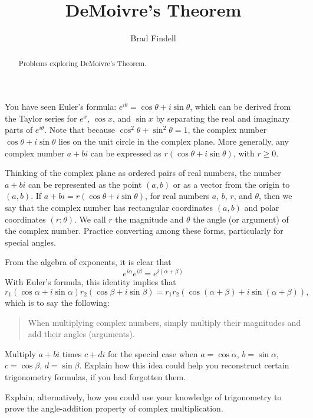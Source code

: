 \documentclass[space,nooutcomes]{ximera}
\title{DeMoivre's Theorem}
\author{Brad Findell}
\begin{document}
\begin{abstract}
Problems exploring DeMoivre's Theorem.   
\end{abstract}
\maketitle




You have seen Euler's formula: $e^{i\theta}=\cos\theta +i\sin\theta$, which can be derived from the Taylor series for $e^{x}$, $\cos x$, and $\sin x$ by separating the real and imaginary parts of $e^{i\theta}$.  Note that because 
$\cos^2\theta+\sin^2\theta=1$, the complex number $\cos\theta +i\sin\theta$ lies on the 
unit circle in the complex plane.  More generally, any complex number $a+bi$ can be expressed as $r(\cos\theta +i\sin\theta)$, with $r\ge 0$.  

Thinking of the complex plane as ordered pairs of real numbers, the number $a+bi$ can be represented as the point $(a,b)$ or as a vector from the origin to
$(a,b)$.  If $a+bi = r(\cos\theta +i\sin\theta)$, for real numbers $a$, $b$, $r$, and $\theta$, then we say that the complex number has rectangular coordinates $(a,b)$ and polar coordinates $(r;\theta)$. We call $r$ the magnitude and $\theta$ the angle (or argument) of the complex number. Practice converting among these forms, particularly for special angles.


\begin{problem}
From the algebra of exponents, it is clear that 
\[
e^{i\alpha}e^{i\beta}=e^{i(\alpha + \beta)} 
\]
With Euler's formula, this identity implies that 
\[
r_1(\cos\alpha + i\sin\alpha)r_2(\cos\beta + i\sin\beta)
=r_1 r_2\left(\cos(\alpha+\beta) + i\sin(\alpha+\beta)\right), 
\]
which is to say the following:  
\begin{quote}
When multiplying complex numbers, simply multiply their magnitudes and add their angles (arguments).  
\end{quote}
\end{problem}

\begin{problem}
Multiply $a + bi$ times $c + di$ for the special case when $a=\cos\alpha$, $b=\sin\alpha$, 
$c=\cos\beta$, $d=\sin\beta$.  Explain how this idea could help you reconstruct certain trigonometry formulas, if you had forgotten them.  

Explain, alternatively, how you could use your knowledge of trigonometry to prove the angle-addition property of complex multiplication.  
\end{problem}
\end{document}
